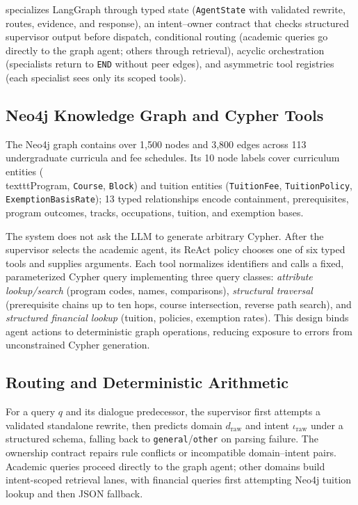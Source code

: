 \system{} specializes LangGraph through typed state (\texttt{AgentState} with validated rewrite, routes, evidence, and response), an intent--owner contract that checks structured supervisor output before dispatch, conditional routing (academic queries go directly to the graph agent; others through retrieval), acyclic orchestration (specialists return to \texttt{END} without peer edges), and asymmetric tool registries (each specialist sees only its scoped tools).

\subsection{Neo4j Knowledge Graph and Cypher Tools}
\label{sec:neo4j_graph}

The Neo4j graph contains over 1,500 nodes and 3,800 edges across 113 undergraduate curricula and fee schedules. Its 10 node labels cover curriculum entities (\\texttt{Program}, \texttt{Course}, \texttt{Block}) and tuition entities (\texttt{TuitionFee}, \texttt{TuitionPolicy}, \texttt{ExemptionBasisRate}); 13 typed relationships encode containment, prerequisites, program outcomes, tracks, occupations, tuition, and exemption bases.

The system does not ask the LLM to generate arbitrary Cypher. After the supervisor selects the academic agent, its ReAct policy chooses one of six typed tools and supplies arguments. Each tool normalizes identifiers and calls a fixed, parameterized Cypher query implementing three query classes: \emph{attribute lookup/search} (program codes, names, comparisons), \emph{structural traversal} (prerequisite chains up to ten hops, course intersection, reverse path search), and \emph{structured financial lookup} (tuition, policies, exemption rates). This design binds agent actions to deterministic graph operations, reducing exposure to errors from unconstrained Cypher generation.

\subsection{Routing and Deterministic Arithmetic}
\label{sec:algorithms}

For a query $q$ and its dialogue predecessor, the supervisor first attempts a validated standalone rewrite, then predicts domain $d_{\mathrm{raw}}$ and intent $\iota_{\mathrm{raw}}$ under a structured schema, falling back to \texttt{general}/\texttt{other} on parsing failure. The ownership contract repairs rule conflicts or incompatible domain--intent pairs. Academic queries proceed directly to the graph agent; other domains build intent-scoped retrieval lanes, with financial queries first attempting Neo4j tuition lookup and then JSON fallback.

